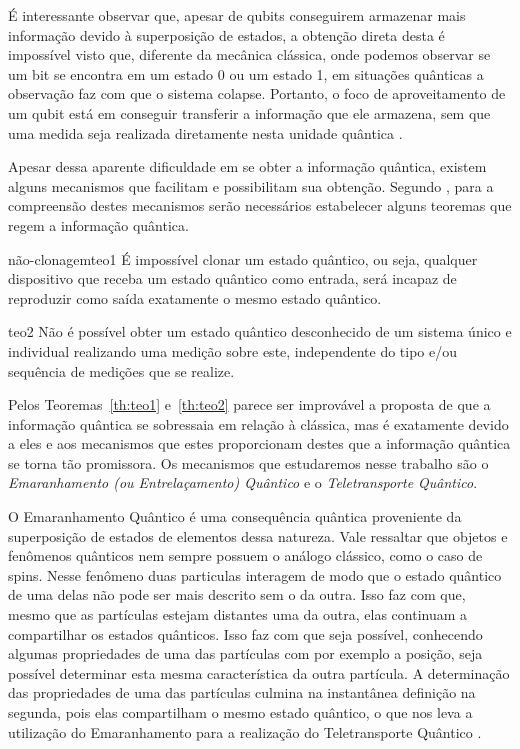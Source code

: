 \documentclass[12pt,oneside,brazil,hidelinks,article,sumario=tradicional,a4paper]{abntex2}
\begin{document}
É interessante observar que, apesar de qubits conseguirem armazenar mais informação devido à superposição de estados, a obtenção direta desta é impossível visto que, diferente da mecânica clássica, onde podemos observar se um bit se encontra em um estado 0 ou um estado 1, em situações quânticas a observação faz com que o sistema colapse. Portanto, o foco de aproveitamento de um qubit está em conseguir transferir a informação que ele armazena, sem que uma medida seja realizada diretamente nesta unidade quântica \cite{chuang}.

Apesar dessa aparente dificuldade em se obter a informação quântica, existem alguns mecanismos que facilitam e possibilitam sua obtenção. Segundo \textcite{materialdidaticomecquantica}, para a compreensão destes mecanismos serão necessários estabelecer alguns teoremas que regem a informação quântica.

\begin{theo}{não-clonagem}{teo1}
É impossível clonar um estado quântico, ou seja, qualquer dispositivo que receba um estado quântico como entrada, será incapaz de reproduzir como saída exatamente o mesmo estado quântico.
\end{theo}

\begin{theo}{}{teo2}
Não é possível obter um estado quântico desconhecido de um sistema único e individual realizando uma medição sobre este, independente do tipo e/ou sequência de medições que se realize.
\end{theo}

Pelos Teoremas~\ref{th:teo1} e~\ref{th:teo2} parece ser improvável a proposta de que a informação quântica se sobressaia em relação à clássica, mas é exatamente devido a eles e aos mecanismos que estes proporcionam destes que a informação quântica se torna tão promissora. Os mecanismos que estudaremos nesse trabalho são o \textit{Emaranhamento (ou Entrelaçamento) Quântico} e o \textit{Teletransporte Quântico}.

O Emaranhamento Quântico é uma consequência quântica proveniente da superposição de estados de elementos dessa natureza. Vale ressaltar que objetos e fenômenos quânticos nem sempre possuem o análogo clássico, como o caso de spins. Nesse fenômeno duas particulas interagem de modo que o estado quântico de uma delas não pode ser mais descrito sem o da outra. Isso faz com que, mesmo que as partículas estejam distantes uma da outra, elas continuam a compartilhar os estados quânticos. Isso faz com que seja possível, conhecendo algumas propriedades de uma das partículas com por exemplo a posição, seja possível determinar esta mesma característica da outra partícula. A determinação das propriedades de uma das partículas culmina na instantânea definição na segunda, pois elas compartilham o mesmo estado quântico, o que nos leva a utilização do Emaranhamento para a realização do Teletransporte Quântico \cites{materialdidaticomecquantica}{fonzar}{TeoQuanInfoEntreCopia}.
\end{document}
